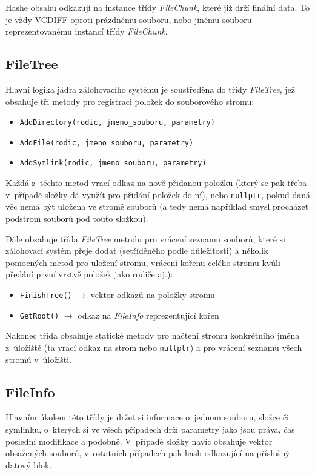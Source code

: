 Hashe obsahu odkazují na instance třídy {\it FileChunk}, které již drží finální
data. To je vždy \gls{VCDIFF} oproti prázdnému souboru, nebo jinému souboru
reprezentovanému instancí třídy {\it FileChunk}.

\subsection{FileTree}

Hlavní logika jádra zálohovacího systému je soustředěna do třídy {\it FileTree},
jež obsahuje tři metody pro registraci položek do souborového stromu:

\begin{itemize}
	\item\texttt{AddDirectory(rodic, jmeno\_souboru, parametry)}
	\item\texttt{AddFile(rodic, jmeno\_souboru, parametry)}
	\item\texttt{AddSymlink(rodic, jmeno\_souboru, parametry)}
\end{itemize}

Každá z~těchto metod vrací odkaz na nově přidanou položku (který se pak třeba
v~případě složky dá využít pro přidání položek do ní), nebo \texttt{nullptr},
pokud daná věc nemá být uložena ve stromě souborů (a tedy nemá například smysl
procházet podstrom souborů pod touto složkou).

Dále obsahuje třída {\it FileTree} metodu pro vrácení seznamu souborů, které si
zálohovací systém přeje dodat (setříděného podle důležitosti) a několik
pomocných metod pro uložení stromu, vrácení kořenu celého stromu kvůli předání
první vrstvě položek jako rodiče aj.):

\begin{itemize}
	\item\texttt{FinishTree()} $\rightarrow$ vektor odkazů na položky stromu
	\item\texttt{GetRoot()} $\rightarrow$ odkaz na {\it FileInfo}
	reprezentující kořen
\end{itemize}

Nakonec třída obsahuje statické metody pro načtení stromu konkrétního jména
z~úložiště (ta vrací odkaz na strom nebo \texttt{nullptr}) a pro vrácení seznamu
všech stromů v~úložišti.

\subsection{FileInfo}

Hlavním úkolem této třídy je držet si informace o~jednom souboru, složce či
symlinku, o~kterých si ve všech případech drží parametry jako jsou práva, čas
poslední modifikace a podobně. V~případě složky navíc obsahuje vektor obsažených
souborů, v~ostatních případech pak hash odkazující na příslušný datový blok.

